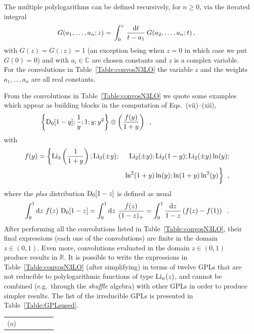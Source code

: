 \documentclass[12pt]{article}
\DeclareRobustCommand{\nn}{\nonumber}
\def\beq{\begin{equation}}
\def\eeq{\end{equation}}
\def\beeq{\begin{eqnarray}}
\def\eeeq{\end{eqnarray}}
\DeclareRobustCommand{\rd}{\ensuremath{\mathrm{d}}}
\begin{document}
\begin{appendix}
The multiple polylogarithms can be defined recursively, for $n\geq 0$, via the iterated integral~\cite{Goncharov:1998kja,Gehrmann:2000zt,Goncharov:2001iea}
 \beq\label{MultPolyLogdef}
 G(a_1,\ldots,a_n;z)=\,\int_0^z\,\frac{\rd t}{t-a_1}\,G(a_2,\ldots,a_n;t)\,,\\
\eeq
with $G(z) = G(;z)=1$ (an exception being when $z=0$ in which case we put $G(0)=0$) and with $a_i\in \mathbb{C}$ are chosen constants and $z$ is a complex variable. For the convolutions in Table~\ref{Table:convosN3LO} the variable $z$ and the weights $a_1,\ldots,a_n$ are all real constants.

From the convolutions in Table~\ref{Table:convosN3LO} we quote some  examples which appear as building blocks in the computation of Eqs.~(vii)--(xii),
\beeq
\!\!\!\!\!\!\!\!\!\!\!\!&&\!\!\!\!\!\!\!\!\!\!\!\!\!\!\!\!\!\!\!\!\!\!\!\!\!\!\!\!\!\!\!\!\!\!\!\!\!\!\!\!\!\!\!\!\!\!\!\!\bigg\{{\rm D}_{0}[1-y];\frac{1}{y};1;y;y^{2}\bigg\} \otimes \left( \frac{f(y)}{1+y} \right)\;\;,
\eeeq
with 
\beeq 
f(y)=\bigg\{{\rm Li}_{3}\left(\frac{1}{1+y}\right); {\rm Li}_{3}(\pm y);&&\!\!\!\!\!\!\!\!\!{\rm Li}_{2}(\pm y); {\rm Li}_{2}(1- y); {\rm Li}_{2}(\pm y) \ln(y);\nn\\
&&\ln^{2}(1+y)\ln(y);\ln(1+y)\ln^{2}(y)\bigg\}\;\;,
\eeeq
where the \textit{plus} distribution ${\rm D}_{0}[1-z]$ is defined as usual 
\beeq
\int^{1}_{0}\rd z~f(z)~{\rm D}_{0}[1-z] =\int^{1}_{0}\rd z~\frac{f(z)}{(1-z)_{+}} = \int^{1}_{0}\frac{\rd z}{1-z}\left( f(z)-f(1)\right)\;\;.
\eeeq
After performing all the convolutions listed in Table~\ref{Table:convosN3LO}, their final expressions (each one of the convolutions) are finite in the domain $z\in (0,1)$. Even more, convolutions evaluated in the domain $z\in (0,1)$ produce results in $\mathbb{R}$. It is possible to write the expressions in Table~\ref{Table:convosN3LO} (after simplifying) in terms of twelve GPLs that are not reducible to polylogarithmic functions of type ${\rm Li}_n(z)$, 
 and cannot be combined (e.g.\ through the \textit{shuffle} algebra) with other GPLs in order to produce simpler results. 
The list of the irreducible GPLs is presented in Table~\ref{Table:GPLsused}.
\begin{table}
\begin{center}
\renewcommand{\arraystretch}{1.5}
\begin{tabular}{ |c|c||c|c||c|c| }
\hline
\multirow{1}{*}{(a)} 


\end{tabular}
\end{center}
\end{table}
\end{appendix}
\end{document}

